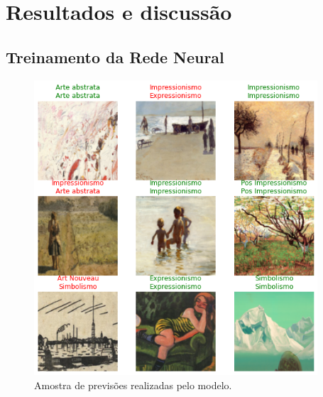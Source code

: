 \documentclass[12pt, a4paper]{article}
\begin{document}
\section{Resultados e discussão}
\subsection{Treinamento da Rede Neural}

\begin{figure}[H]
	\centering
	\includegraphics[width=\textwidth, height=11cm, keepaspectratio=true]{fig/resultsbatch}
	\caption{Amostra de previsões realizadas pelo modelo.}
\end{figure}
\end{document}
